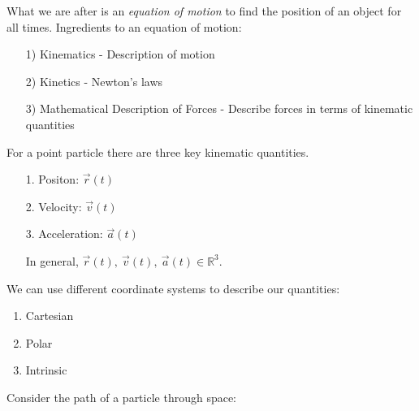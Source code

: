 \setcounter{lecture}{1}
\pagebreak
{}
\setcounter{page}{4}

What  we are after is an \emph{equation of motion} to find the position of an object for all times. Ingredients to an equation of motion:\begin{enumerate}
\item[1)] Kinematics - Description of motion 
\item[2)] Kinetics - Newton's laws
\item[3)] Mathematical Description of Forces - Describe forces in terms of kinematic quantities
\end{enumerate}


\label{sub:sets}



For a point particle there are three key kinematic quantities.\begin{enumerate}
\item[1.] Positon: $\vec{r}(t)$
\item[2.] Velocity: $\vec{v}(t)$
\item[3.] Acceleration: $\vec{a}(t)$

In general, $\vec{r}(t),~\vec{v}(t),~\vec{a}(t) \in \mathbb{R}^3$. 
\end{enumerate}\vspace*{5pt}

We can use different coordinate systems to describe our quantities:
\begin{enumerate}
\item Cartesian
\item Polar
\item Intrinsic	
\end{enumerate}

Consider the path of a particle through space:

\vspace*{100pt}

